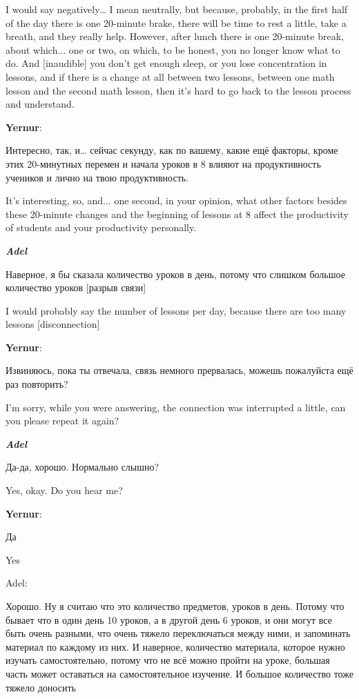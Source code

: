 I would say negatively… I mean neutrally, but because, probably, in the first half of the day there is one 20-minute brake, there will be time to rest a little, take a breath, and they really help. However, after lunch there is one 20-minute break, about which... one or two, on which, to be honest, you no longer know what to do. And [inaudible] you don't get enough sleep, or you lose concentration in lessons, and if there is a change at all between two lessons, between one math lesson and the second math lesson, then it's hard to go back to the lesson process and understand.

\textbf{Yernur}: 

Интересно, так, и… сейчас секунду, как по вашему, какие ещё факторы, кроме этих 20-минутных перемен и начала уроков в 8 влияют на продуктивность учеников и лично на твою продуктивность.

It's interesting, so, and... one second, in your opinion, what other factors besides these 20-minute changes and the beginning of lessons at 8 affect the productivity of students and your productivity personally.

\textbf{\textit{Adel}}

Наверное, я бы сказала количество уроков в день, потому что слишком большое количество уроков [разрыв связи] 

I would probably say the number of lessons per day, because there are too many lessons [disconnection]

\textbf{Yernur}: 

Извиняюсь, пока ты отвечала, связь немного прервалась, можешь пожалуйста ещё раз повторить?

I'm sorry, while you were answering, the connection was interrupted a little, can you please repeat it again?

\textbf{\textit{Adel}}

Да-да, хорошо. Нормально слышно?

Yes, okay. Do you hear me?

\textbf{Yernur}: 

Да

Yes

Adel:

Хорошо. Ну я считаю что это количество предметов, уроков в день. Потому что бывает что в один день 10 уроков, а в другой день 6 уроков, и они могут все быть очень разными, что очень тяжело переключаться между ними, и запоминать материал по каждому из них. И наверное, количество материала, которое нужно изучать самостоятельно, потому что не всё можно пройти на уроке, большая часть может оставаться на самостоятельное изучение. И большое количество тоже тяжело доносить

